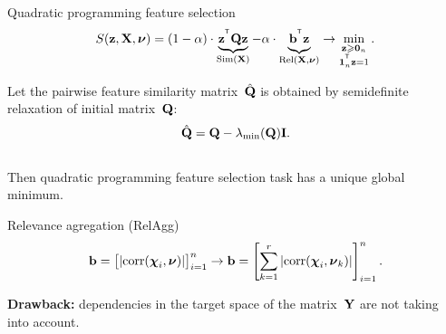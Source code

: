 \documentclass[10pt]{beamer}
\begin{document}
\begin{frame}{Quadratic programming feature selection}
		\[
		S(\mathbf{z}, \mathbf{X}, \boldsymbol{\nu}) = (1 - \alpha) \cdot \underbrace{\mathbf{z}^{^{\text{\tiny\sffamily\upshape\mdseries T}}} \mathbf{Q} \mathbf{z}}_{\text{Sim}(\mathbf{X})} - \alpha \cdot \underbrace{\vphantom{()} \mathbf{b}^{^{\text{\tiny\sffamily\upshape\mdseries T}}} \mathbf{z}}_{\text{Rel}(\mathbf{X}, \boldsymbol{\nu})} \rightarrow \min_{\substack{\mathbf{z} \geqslant \boldsymbol{0}_n \\ \boldsymbol{1}_n^{^{\text{\tiny\sffamily\upshape\mdseries T}}} \mathbf{z}=1}}.
		\]

	\begin{theorem}[Isachenko, 2018]
		Let the pairwise feature similarity matrix~$\hat{\mathbf{Q}}$ is obtained by semidefinite relaxation of initial matrix~$\mathbf{Q}$:
		\vspace{-0.2cm}
		\begin{equation*}
			\hat{\mathbf{Q}} = \mathbf{Q} - \lambda_{\min}(\mathbf{Q}) \mathbf{I}.
		\end{equation*}
		\vspace{-0.7cm} \\
		Then quadratic programming feature selection task has a unique global minimum.
	\end{theorem}
	\begin{block}{Relevance agregation (RelAgg)}
	\vspace{-0.2cm}
		\[
			\mathbf{b} = \bigl[\left|\text{corr}(\boldsymbol{\chi}_i, \boldsymbol{\nu})\right|\bigr]_{i=1}^n \rightarrow \mathbf{b} = \left[\sum_{k=1}^r\left|\text{corr}(\boldsymbol{\chi}_i, \boldsymbol{\nu}_k)\right|\right]_{i=1}^n.
		\]
	\end{block}
	{\bf Drawback:} dependencies in the target space of the matrix~$\mathbf{Y}$ are not taking into account. 
	
\end{frame}
\end{document}
